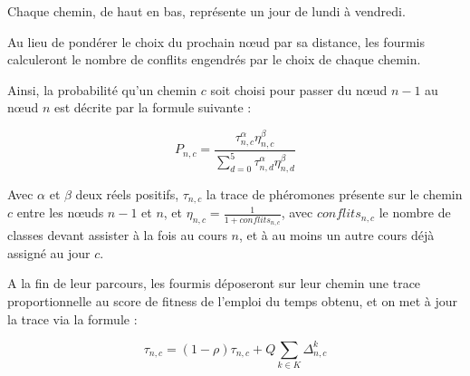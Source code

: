 \begin{center}
\end{center}

Chaque chemin, de haut en bas, représente un jour de lundi à vendredi.

Au lieu de pondérer le choix du prochain n\oe ud par sa distance, les fourmis calculeront le nombre de conflits engendrés par le choix de chaque chemin.

Ainsi, la probabilité qu'un chemin $c$ soit choisi pour passer du n\oe ud $n-1$ au n\oe ud $n$ est décrite par la formule suivante :

$$P_{n,c} = \frac{\tau^{\alpha}_{n,c}\eta^{\beta}_{n,c}}{\sum^{5}_{d = 0}{\tau^{\alpha}_{n,d}\eta^{\beta}_{n,d}}}$$

Avec $\alpha$ et $\beta$ deux réels positifs, $\tau_{n,c}$ la trace de phéromones présente sur le chemin $c$ entre les n\oe uds $n-1$ et $n$, et $\eta_{n,c} = \frac{1}{1 + conflits_{n,c}}$, avec $conflits_{n,c}$ le nombre de classes devant assister à la fois au cours $n$, et à au moins un autre cours déjà assigné au jour $c$.

A la fin de leur parcours, les fourmis déposeront sur leur chemin une trace proportionnelle au score de fitness de l'emploi du temps obtenu, et on met à jour la trace via la formule :

$$\tau_{n,c} = (1-\rho)\tau_{n,c} + Q\sum_{k \in K}{\Delta^k_{n,c}}$$

